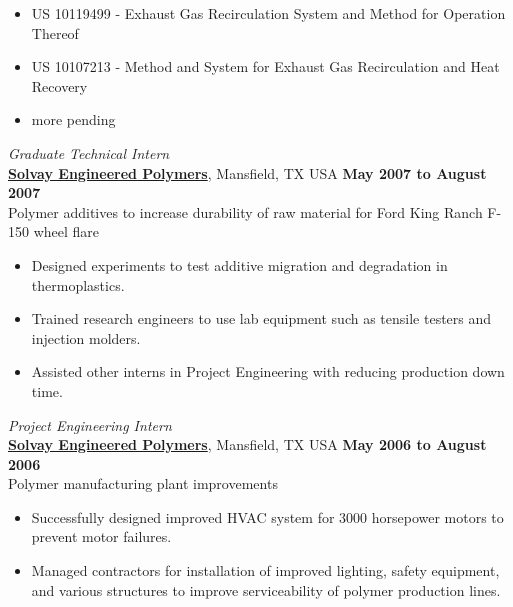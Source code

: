 \documentclass[centered]{res}
\begin{document}
\begin{resume}
\begin{itemize}
\item US 10119499 - Exhaust Gas Recirculation System and Method for Operation Thereof
\item US 10107213 - Method and System for Exhaust Gas Recirculation and Heat Recovery
\item more pending
\end{itemize} \vspace{-8pt}
%
\textit{Graduate Technical Intern} \\
\href{http://www.lyondellbasell.com/LandingPages/SolvayEngineeredPolymers}{\textbf{Solvay
    Engineered Polymers}}, Mansfield, TX USA 
\hfill \textbf{May 2007 to August 2007} \\
Polymer additives to increase durability of raw material for Ford King
Ranch F-150 wheel flare
\begin{itemize} \itemsep -2pt %
\item Designed experiments to test additive migration
  and degradation in thermoplastics.
\item Trained research engineers to use lab equipment such as tensile
  testers and injection molders.
\item Assisted other interns in Project Engineering with
  reducing production down time.
\end{itemize} \vspace{-8pt}
%
\textit{Project Engineering Intern} \\
\href{http://www.lyondellbasell.com/LandingPages/SolvayEngineeredPolymers}{\textbf{Solvay
    Engineered Polymers}}, Mansfield, TX USA 
\hfill \textbf{May 2006 to August 2006} \\
Polymer manufacturing plant improvements 
\begin{itemize} \itemsep -2pt %
\item Successfully designed improved HVAC system for 3000 horsepower
  motors to prevent motor failures.
\item Managed contractors for installation of improved lighting,
  safety equipment, and various structures to improve serviceability
  of polymer production lines.
\end{itemize} 
%

\end{resume}
\end{document}
